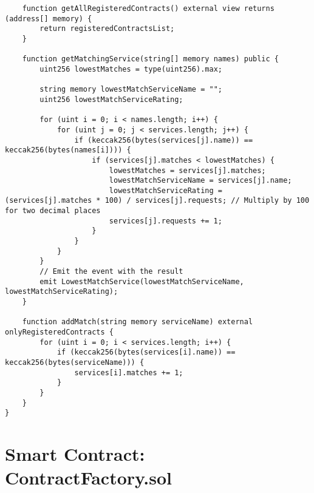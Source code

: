\begin{lstlisting}
    function getAllRegisteredContracts() external view returns (address[] memory) {
        return registeredContractsList;
    }

    function getMatchingService(string[] memory names) public {
        uint256 lowestMatches = type(uint256).max;

        string memory lowestMatchServiceName = "";
        uint256 lowestMatchServiceRating;

        for (uint i = 0; i < names.length; i++) {
            for (uint j = 0; j < services.length; j++) {
                if (keccak256(bytes(services[j].name)) == keccak256(bytes(names[i]))) {
                    if (services[j].matches < lowestMatches) {
                        lowestMatches = services[j].matches;
                        lowestMatchServiceName = services[j].name;
                        lowestMatchServiceRating = (services[j].matches * 100) / services[j].requests; // Multiply by 100 for two decimal places
                        services[j].requests += 1;
                    }
                }
            }
        }
        // Emit the event with the result
        emit LowestMatchService(lowestMatchServiceName, lowestMatchServiceRating);
    }

    function addMatch(string memory serviceName) external onlyRegisteredContracts {
        for (uint i = 0; i < services.length; i++) {
            if (keccak256(bytes(services[i].name)) == keccak256(bytes(serviceName))) {
                services[i].matches += 1;
            }
        }
    }
}
\end{lstlisting}


\section{Smart Contract: ContractFactory.sol}
\lstset{
  basicstyle=\footnotesize\ttfamily,
  breaklines=true,
  numbers=left,
  firstnumber=1,
}


